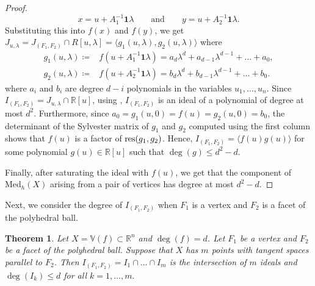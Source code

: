 \documentclass{article}
\newtheorem{theorem}{Theorem}
\numberwithin{theorem}{section}
\theoremstyle{definition}
\theoremstyle{example_contd}
\newcommand{\RR}{\mathbb{R}}
\newcommand{\med}{\mathrm{Med}_h}
\newcommand{\IF}{I_{(F_1,F_2)}}
\newcommand{\JF}{J_{(F_1,F_2)}}
\renewcommand{\l}{\lambda}
\newcommand{\V}{{\mathbb{V}}}
\begin{document}
\begin{proof}
	\[x=u+A_1^{-1}\mathbf{1}\lambda \qquad \mbox{and} \qquad y=u+A_2^{-1}\mathbf{1}\lambda. \]
	 Substituting this into $f(x)$ and $f(y)$, we get $J_{u,\l}=\JF \cap R[u,\l]=\langle g_1(u,\l),g_2(u,\l)\rangle$ where
	 \begin{equation*}
	 	\begin{split}
	 		g_1(u,\lambda)\coloneqq & f(u+A_1^{-1}\mathbf{1}\lambda) = a_d \lambda^d + a_{d-1}\lambda^{d-1} + \ldots + a_0,\\
	 		g_2(u,\lambda)\coloneqq & f(u+A_2^{-1}\mathbf{1}\lambda) = b_d \lambda^d + b_{d-1}\lambda^{d-1} + \ldots + b_0.
	 	\end{split}
	 \end{equation*}
	where $a_i$ and $b_i$ are degree $d-i$ polynomials in the variables $u_1,\ldots,u_n$. 
	Since $\IF=J_{u,\l}\cap \RR[u]$, using , $\IF$ is an ideal of a polynomial of degree at most $d^2$.  Furthermore, since $a_0=g_1(u,0)=f(u)=g_2(u,0)=b_0$, the determinant of the Sylvester matrix of $g_1$ and $g_2$ computed using the first column shows that $f(u)$ is a factor of ${\rm res}(g_1,g_2)$. Hence, $\IF=\langle f(u)g(u)\rangle$ for some polynomial $g(u)\in \RR[u]$ such that $\deg(g)\leq d^2-d.$
    
    Finally, after saturating the ideal with $f(u)$, we get that the component of $\med(X)$ arising from a pair of vertices has degree at most $d^2 - d$.
\end{proof}


Next, we consider the degree of $\IF$ when $F_1$ is a vertex and $F_2$ is a facet of the polyhedral ball.

\begin{theorem}\label{thm:vertex-facet}
	Let $X=\V(f)\subset \RR^n$ and $\deg(f) = d$. Let $F_1$ be a vertex and $F_2$ be a facet of the polyhedral ball. Suppose that $X$ has $m$ points with tangent spaces parallel to $F_2$. Then $\IF=I_1\cap\ldots\cap I_m$ is the intersection of $m$ ideals and $\deg(I_k)\leq d$ for all $k=1,\ldots,m.$
\end{theorem}
\end{document}
